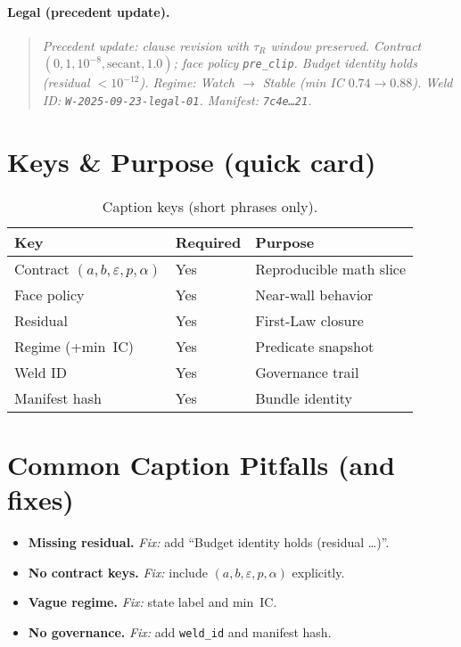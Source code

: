 \paragraph{Legal (precedent update).}
\begin{quote}\itshape
Precedent update: clause revision with \(\tau_R\) window preserved.
Contract \((0,1,10^{-8},\text{secant},1.0)\); face policy \texttt{pre\_clip}.
Budget identity holds (residual \(<10^{-12}\)).
Regime: \emph{Watch} \(\to\) \emph{Stable} (min IC \(0.74\to0.88\)).
Weld ID: \texttt{W-2025-09-23-legal-01}. Manifest: \texttt{7c4e…21}.
\end{quote}

\section{Keys \& Purpose (quick card)}
\label{sec:captions-keys}

\begin{table}[h]
  \centering
  \caption{Caption keys (short phrases only).}
  \label{tab:caption-keys}
  \footnotesize
  \begingroup\setlength{\tabcolsep}{6pt}
  \begin{tabularx}{\linewidth}{@{} l l >{\raggedright\arraybackslash}X @{}}
    \toprule
    Key & Required & Purpose \\
    \midrule
    Contract \((a,b,\varepsilon,p,\alpha)\) & Yes & Reproducible math slice \\
    Face policy & Yes & Near-wall behavior \\
    Residual & Yes & First-Law closure \\
    Regime (+min~IC) & Yes & Predicate snapshot \\
    Weld ID & Yes & Governance trail \\
    Manifest hash & Yes & Bundle identity \\
    \bottomrule
  \end{tabularx}
  \endgroup
\end{table}

\section{Common Caption Pitfalls (and fixes)}
\label{sec:captions-pitfalls}

\begin{itemize}[leftmargin=1.25em]
  \item \textbf{Missing residual.} \emph{Fix:} add “Budget identity holds (residual …)”.
  \item \textbf{No contract keys.} \emph{Fix:} include \((a,b,\varepsilon,p,\alpha)\) explicitly.
  \item \textbf{Vague regime.} \emph{Fix:} state label and min~IC.
  \item \textbf{No governance.} \emph{Fix:} add \texttt{weld\_id} and manifest hash.
\end{itemize}

